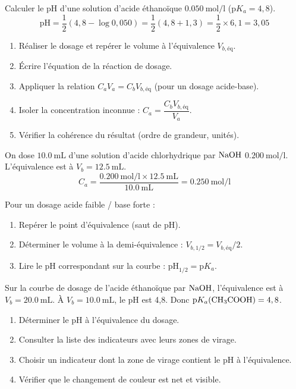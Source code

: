\begin{exemple}
Calculer le pH d'une solution d'acide éthanoïque $\SI{0,050}{\mol\per\litre}$ ($\mathrm{p}K_a = 4,8$).
\[\mathrm{pH} = \frac{1}{2}(4,8 - \log 0,050) = \frac{1}{2}(4,8 + 1,3) = \frac{1}{2} \times 6,1 = 3,05\]
\end{exemple}

\begin{enumerate}
    \item Réaliser le dosage et repérer le volume à l'équivalence $V_{b,\text{éq}}$.
    \item Écrire l'équation de la réaction de dosage.
    \item Appliquer la relation $C_a V_a = C_b V_{b,\text{éq}}$ (pour un dosage acide-base).
    \item Isoler la concentration inconnue : $C_a = \dfrac{C_b V_{b,\text{éq}}}{V_a}$.
    \item Vérifier la cohérence du résultat (ordre de grandeur, unités).
\end{enumerate}

\begin{exemple}
On dose $\SI{10,0}{\mL}$ d'une solution d'acide chlorhydrique par $\ce{NaOH}$ $\SI{0,200}{\mol\per\litre}$. L'équivalence est à $V_b = \SI{12,5}{\mL}$.
\[C_a = \frac{\SI{0,200}{\mol\per\litre} \times \SI{12,5}{\mL}}{\SI{10,0}{\mL}} = \SI{0,250}{\mol\per\litre}\]
\end{exemple}

Pour un dosage acide faible / base forte :
\begin{enumerate}
    \item Repérer le point d'équivalence (saut de pH).
    \item Déterminer le volume à la demi-équivalence : $V_{b,1/2} = V_{b,\text{éq}}/2$.
    \item Lire le pH correspondant sur la courbe : $\mathrm{pH}_{1/2} = \mathrm{p}K_a$.
\end{enumerate}

\begin{exemple}
Sur la courbe de dosage de l'acide éthanoïque par $\ce{NaOH}$, l'équivalence est à $V_b = \SI{20,0}{\mL}$. À $V_b = \SI{10,0}{\mL}$, le pH est 4,8. Donc $\mathrm{p}K_a(\ce{CH3COOH}) = 4,8$.
\end{exemple}

\begin{enumerate}
    \item Déterminer le pH à l'équivalence du dosage.
    \item Consulter la liste des indicateurs avec leurs zones de virage.
    \item Choisir un indicateur dont la zone de virage contient le pH à l'équivalence.
    \item Vérifier que le changement de couleur est net et visible.
\end{enumerate}

